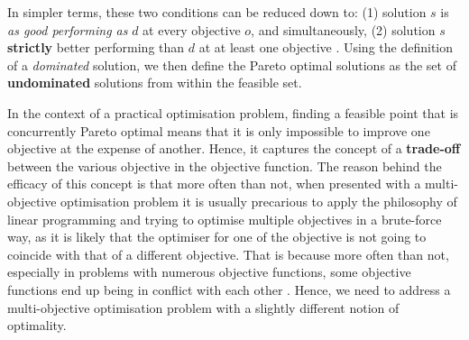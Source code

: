 \vspace{\baselineskip}
\noindent
In simpler terms, these two conditions can be reduced down to: (1) solution $s$ is \textit{as good performing as} $d$ at every objective $o$, and simultaneously, (2) solution $s$ \textbf{strictly} better performing than $d$ at at least one objective \cite{DUMMY:6}. Using the definition of a \textit{dominated} solution, we then define the Pareto optimal solutions as the set of \textbf{undominated} solutions from within the feasible set.

\vspace{\baselineskip}
\noindent
In the context of a practical optimisation problem, finding a feasible point that is concurrently Pareto optimal means that it is only impossible to improve one objective at the expense of another. Hence, it captures the concept of a \textbf{trade-off} between the various objective in the objective function. The reason behind the efficacy of this concept is that more often than not, when presented with a multi-objective optimisation problem it is usually precarious to apply the philosophy of linear programming and trying to optimise multiple objectives in a brute-force way, as it is likely that the optimiser for one of the objective is not going to coincide with that of a different objective. That is because more often than not, especially in problems with numerous objective functions, some objective functions end up being in conflict with each other \cite{grinding}. Hence, we need to address a multi-objective optimisation problem with a slightly different notion of optimality. 


